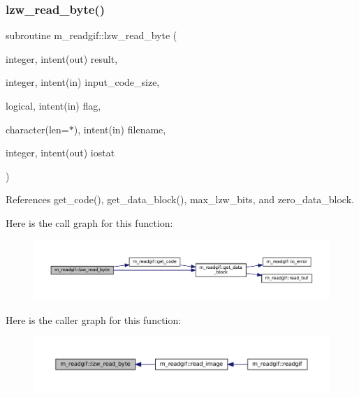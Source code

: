 \subsubsection{\texorpdfstring{lzw\+\_\+read\+\_\+byte()}{lzw\_read\_byte()}}
{\footnotesize\ttfamily subroutine m\+\_\+readgif\+::lzw\+\_\+read\+\_\+byte (\begin{DoxyParamCaption}\item[{integer, intent(out)}]{result,  }\item[{integer, intent(in)}]{input\+\_\+code\+\_\+size,  }\item[{logical, intent(in)}]{flag,  }\item[{character(len=$\ast$), intent(in)}]{filename,  }\item[{integer, intent(out)}]{iostat }\end{DoxyParamCaption})\hspace{0.3cm}{\ttfamily [private]}}



References get\+\_\+code(), get\+\_\+data\+\_\+block(), max\+\_\+lzw\+\_\+bits, and zero\+\_\+data\+\_\+block.

Here is the call graph for this function\+:
\nopagebreak
\begin{figure}[H]
\begin{center}
\leavevmode
\includegraphics[width=350pt]{namespacem__readgif_a314e657d0662360266bac5702a657ef1_cgraph}
\end{center}
\end{figure}
Here is the caller graph for this function\+:
\nopagebreak
\begin{figure}[H]
\begin{center}
\leavevmode
\includegraphics[width=350pt]{namespacem__readgif_a314e657d0662360266bac5702a657ef1_icgraph}
\end{center}
\end{figure}
\mbox{\label{namespacem__readgif_ae008e851af60f4d8fdeeb4fd96b8580d}} 
